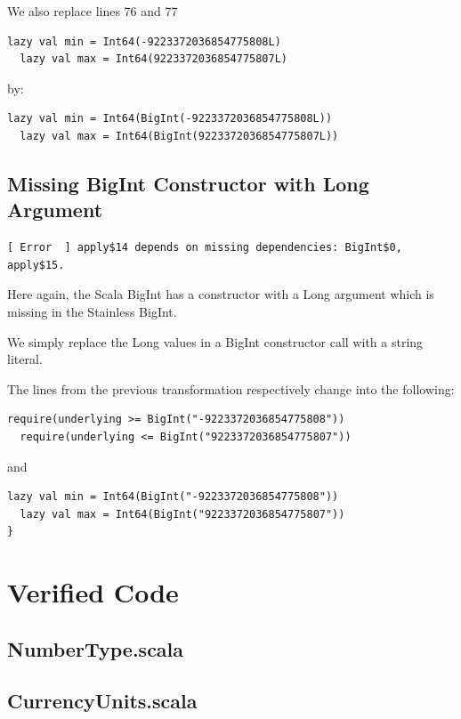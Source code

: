 \documentclass[runningheads]{llncs}
\begin{document}
We also replace lines 76 and 77
\begin{lstlisting}[style=scala]
  lazy val min = Int64(-9223372036854775808L)
  lazy val max = Int64(9223372036854775807L)
\end{lstlisting}

by:
\begin{lstlisting}[style=scala]
  lazy val min = Int64(BigInt(-9223372036854775808L))
  lazy val max = Int64(BigInt(9223372036854775807L))
\end{lstlisting}


\subsection{Missing BigInt Constructor with Long Argument}

\begin{lstlisting}[style=stainless]
[ Error  ] apply$14 depends on missing dependencies: BigInt$0, apply$15.
\end{lstlisting}

Here again, the Scala BigInt has a constructor with a Long argument
which is missing in the Stainless BigInt.

We simply replace the Long values in a BigInt constructor call with a string
literal.

The lines from the previous transformation respectively change into
the following:

\begin{lstlisting}[style=scala]
  require(underlying >= BigInt("-9223372036854775808"))
  require(underlying <= BigInt("9223372036854775807"))
\end{lstlisting}

and

\begin{lstlisting}[style=scala]
  lazy val min = Int64(BigInt("-9223372036854775808"))
  lazy val max = Int64(BigInt("9223372036854775807"))
}
\end{lstlisting}


\section{Verified Code}
\label{sec:verified}

\subsection{NumberType.scala}


\subsection{CurrencyUnits.scala}

\end{document}
